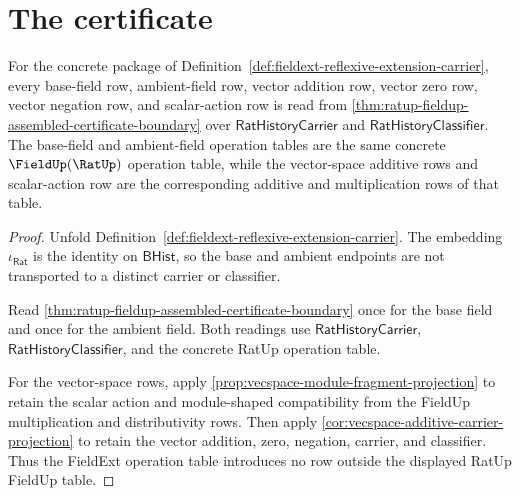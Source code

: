 \section{The certificate}
\label{sec:fieldext-certificate}



\begin{theorem}
\label{thm:fieldext-ratup-reflexive-operation-table-coverage}
For the concrete package of
Definition~\ref{def:fieldext-reflexive-extension-carrier}, every base-field
row, ambient-field row, vector addition row, vector zero row, vector negation
row, and scalar-action row is read from
\autoref{thm:ratup-fieldup-assembled-certificate-boundary} over
$\mathsf{RatHistoryCarrier}$ and $\mathsf{RatHistoryClassifier}$. The
base-field and ambient-field operation tables are the same concrete
$\FieldUp(\RatUp)$ operation table, while the vector-space additive rows and
scalar-action row are the corresponding additive and multiplication rows of
that table.
\end{theorem}
\begin{proof}
Unfold Definition~\ref{def:fieldext-reflexive-extension-carrier}. The
embedding $\iota_{\mathsf{Rat}}$ is the identity on $\mathsf{BHist}$, so the
base and ambient endpoints are not transported to a distinct carrier or
classifier.

Read \autoref{thm:ratup-fieldup-assembled-certificate-boundary} once for the
base field and once for the ambient field. Both readings use
$\mathsf{RatHistoryCarrier}$, $\mathsf{RatHistoryClassifier}$, and the concrete
RatUp operation table.

For the vector-space rows, apply
\autoref{prop:vecspace-module-fragment-projection} to retain the scalar action
and module-shaped compatibility from the FieldUp multiplication and
distributivity rows. Then apply
\autoref{cor:vecspace-additive-carrier-projection} to retain the vector
addition, zero, negation, carrier, and classifier. Thus the FieldExt operation
table introduces no row outside the displayed RatUp FieldUp table.
\end{proof}

